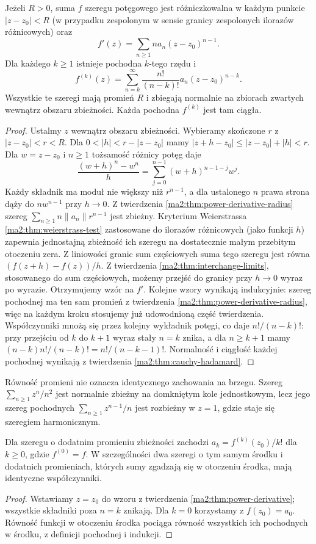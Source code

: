 \begin{twierdzenie}
\label{ma2:thm:power-derivative}
Jeżeli $R>0$, suma $f$ szeregu potęgowego
jest różniczkowalna w każdym punkcie
$|z-z_0|<R$ (w przypadku zespolonym
w sensie granicy zespolonych ilorazów różnicowych)
oraz
\[
 f'(z)=\sum_{n\ge1}na_n(z-z_0)^{n-1}.
\]
Dla każdego $k\ge1$ istnieje pochodna $k$-tego rzędu
i
\[
 f^{(k)}(z)=
 \sum_{n=k}^\infty\frac{n!}{(n-k)!}a_n(z-z_0)^{n-k}.
\]
Wszystkie te szeregi mają promień $R$
i zbiegają normalnie na zbiorach zwartych
wewnątrz obszaru zbieżności. Każda pochodna
$f^{(k)}$ jest tam ciągła.
\end{twierdzenie}
\begin{proof}
Ustalmy $z$ wewnątrz obszaru zbieżności.
Wybieramy skończone $r$ z $|z-z_0|<r<R$.
Dla $0<|h|<r-|z-z_0|$ mamy
$|z+h-z_0|\le |z-z_0|+|h|<r$. Dla $w=z-z_0$ i $n\ge1$
tożsamość różnicy potęg daje
\[
 \frac{(w+h)^n-w^n}{h}
 =\sum_{j=0}^{n-1}(w+h)^{n-1-j}w^j.
\]
Każdy składnik ma moduł nie większy niż
$r^{n-1}$, a dla ustalonego $n$ prawa
strona dąży do $nw^{n-1}$ przy $h\to0$.
Z twierdzenia \ref{ma2:thm:power-derivative-radius}
szereg $\sum_{n\ge1}n\|a_n\|r^{n-1}$ jest
zbieżny. Kryterium Weierstrassa
\ref{ma2:thm:weierstrass-test} zastosowane
do ilorazów różnicowych (jako funkcji $h$)
zapewnia jednostajną zbieżność ich szeregu
na dostatecznie małym przebitym otoczeniu zera.
Z liniowości granic sum częściowych suma
tego szeregu jest równa $(f(z+h)-f(z))/h$.
Z twierdzenia \ref{ma2:thm:interchange-limits},
stosowanego do sum częściowych, możemy
przejść do granicy przy $h\to0$ wyraz po wyrazie.
Otrzymujemy wzór na $f'$.
Kolejne wzory wynikają indukcyjnie:
szereg pochodnej ma ten sam promień
z twierdzenia \ref{ma2:thm:power-derivative-radius},
więc na każdym kroku stosujemy już
udowodnioną część twierdzenia. Współczynniki
mnożą się przez kolejny wykładnik potęgi,
co daje $n!/(n-k)!$: przy przejściu
od $k$ do $k+1$ wyraz stały $n=k$ znika,
a dla $n\ge k+1$ mamy
$(n-k)n!/(n-k)!=n!/(n-k-1)!$.
Normalność i ciągłość każdej pochodnej
wynikają z twierdzenia \ref{ma2:thm:cauchy-hadamard}.
\end{proof}
Równość promieni nie oznacza identycznego
zachowania na brzegu. Szereg $\sum_{n\ge1}z^n/n^2$
jest normalnie zbieżny na domkniętym kole
jednostkowym, lecz jego szereg pochodnych
$\sum_{n\ge1}z^{n-1}/n$ jest rozbieżny w $z=1$,
gdzie staje się szeregiem harmonicznym.

\begin{wniosek}
\label{ma2:cor:power-coefficients}
Dla szeregu o dodatnim promieniu zbieżności
zachodzi $a_k=f^{(k)}(z_0)/k!$ dla $k\ge0$,
gdzie $f^{(0)}=f$.
W szczególności dwa szeregi o tym samym środku
i dodatnich promieniach, których sumy zgadzają
się w otoczeniu środka, mają identyczne współczynniki.
\end{wniosek}
\begin{proof}
Wstawiamy $z=z_0$ do wzoru z twierdzenia
\ref{ma2:thm:power-derivative}; wszystkie składniki
poza $n=k$ znikają. Dla $k=0$ korzystamy
z $f(z_0)=a_0$. Równość funkcji w otoczeniu
środka pociąga równość wszystkich ich pochodnych
w środku, z definicji pochodnej i indukcji.
\end{proof}

